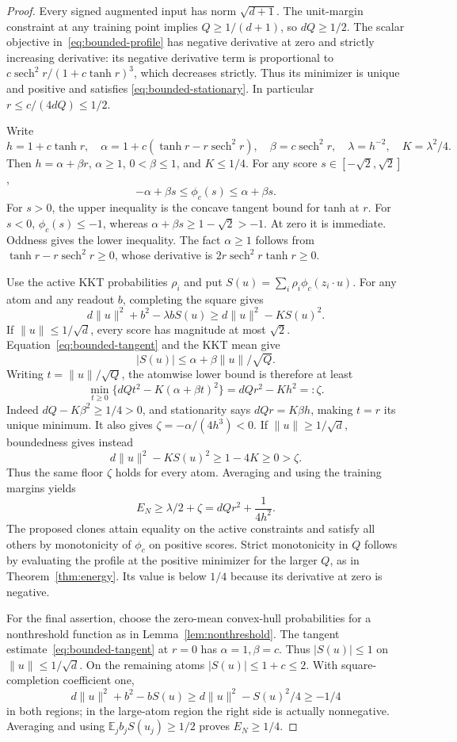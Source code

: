 \documentclass[11pt]{article}
\newcommand{\E}{\mathbb E}
\begin{document}
\begin{proof}
Every signed augmented input has norm $\sqrt{d+1}$. The unit-margin
constraint at any training point implies $Q\ge1/(d+1)$, so $dQ\ge1/2$.
The scalar objective in~\eqref{eq:bounded-profile} has negative derivative
at zero and strictly increasing derivative: its negative derivative
term is proportional to
$c\operatorname{sech}^2r/(1+c\tanh r)^3$, which decreases strictly.
Thus its minimizer is unique and positive and satisfies
\eqref{eq:bounded-stationary}. In particular
$r\le c/(4dQ)\le1/2$.

Write
\[
 h=1+c\tanh r,\quad
 \alpha=1+c(\tanh r-r\operatorname{sech}^2r),\quad
 \beta=c\operatorname{sech}^2r,\quad
 \lambda=h^{-2},\quad K=\lambda^2/4.
\]
Then $h=\alpha+\beta r$, $\alpha\ge1$, $0<\beta\le1$, and $K\le1/4$.
For any score $s\in[-\sqrt2,\sqrt2]$,
\begin{equation}\label{eq:bounded-tangent}
 -\alpha+\beta s\le\phi_c(s)\le\alpha+\beta s.
\end{equation}
For $s>0$, the upper inequality is the concave tangent bound for tanh
at $r$. For $s<0$, $\phi_c(s)\le-1$, whereas
$\alpha+\beta s\ge1-\sqrt2>-1$. At zero it is immediate. Oddness gives
the lower inequality. The fact $\alpha\ge1$ follows from
$\tanh r-r\operatorname{sech}^2r\ge0$, whose derivative is
$2r\operatorname{sech}^2r\tanh r\ge0$.

Use the active KKT probabilities $\rho_i$ and put
$S(u)=\sum_i\rho_i\phi_c(z_i\cdot u)$.
For any atom and any readout $b$, completing the square gives
\[
 d\|u\|^2+b^2-\lambda bS(u)
 \ge d\|u\|^2-KS(u)^2.
\]
If $\|u\|\le1/\sqrt d$, every score has magnitude at most $\sqrt2$.
Equation~\eqref{eq:bounded-tangent} and the KKT mean give
\[
 |S(u)|\le\alpha+\beta\|u\|/\sqrt Q.
\]
Writing $t=\|u\|/\sqrt Q$, the atomwise lower bound is therefore at least
\[
 \min_{t\ge0}\{dQt^2-K(\alpha+\beta t)^2\}
 =dQr^2-Kh^2=:\zeta.
\]
Indeed $dQ-K\beta^2\ge1/4>0$, and stationarity says
$dQr=K\beta h$, making $t=r$ its unique minimum. It also gives
$\zeta=-\alpha/(4h^3)<0$.
If $\|u\|\ge1/\sqrt d$, boundedness gives instead
\[
 d\|u\|^2-KS(u)^2\ge1-4K\ge0>\zeta.
\]
Thus the same floor $\zeta$ holds for every atom. Averaging and using
the training margins yields
\[
 E_N\ge\lambda/2+\zeta
       =dQr^2+\frac1{4h^2}.
\]
The proposed clones attain equality on the active constraints and satisfy
all others by monotonicity of $\phi_c$ on positive scores. Strict
monotonicity in $Q$ follows by evaluating the profile at the positive
minimizer for the larger $Q$, as in Theorem~\ref{thm:energy}. Its value is
below $1/4$ because its derivative at zero is negative.

For the final assertion, choose the zero-mean convex-hull probabilities
for a nonthreshold function as in Lemma~\ref{lem:nonthreshold}.
The tangent estimate~\eqref{eq:bounded-tangent} at $r=0$ has
$\alpha=1,\beta=c$. Thus $|S(u)|\le1$ on $\|u\|\le1/\sqrt d$.
On the remaining atoms $|S(u)|\le1+c\le2$. With square-completion
coefficient one,
\[
 d\|u\|^2+b^2-bS(u)\ge d\|u\|^2-S(u)^2/4\ge-1/4
\]
in both regions; in the large-atom region the right side is actually
nonnegative. Averaging and using $\E_j b_jS(u_j)\ge1/2$ proves
$E_N\ge1/4$.
\end{proof}
\end{document}
